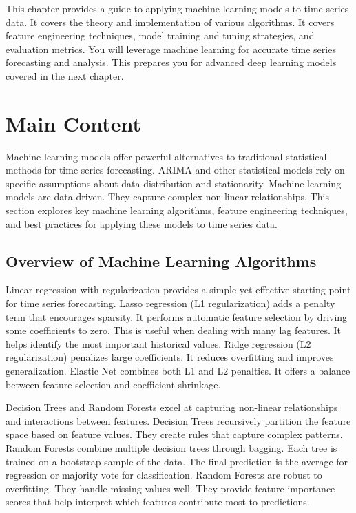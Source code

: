 This chapter provides a guide to applying machine learning models to time series data. It covers the theory and implementation of various algorithms. It covers feature engineering techniques, model training and tuning strategies, and evaluation metrics. You will leverage machine learning for accurate time series forecasting and analysis. This prepares you for advanced deep learning models covered in the next chapter.



\section{Main Content}

Machine learning models offer powerful alternatives to traditional statistical methods for time series forecasting. ARIMA and other statistical models rely on specific assumptions about data distribution and stationarity. Machine learning models are data-driven. They capture complex non-linear relationships. This section explores key machine learning algorithms, feature engineering techniques, and best practices for applying these models to time series data.

\subsection{Overview of Machine Learning Algorithms}

Linear regression with regularization provides a simple yet effective starting point for time series forecasting. Lasso regression (L1 regularization) adds a penalty term that encourages sparsity. It performs automatic feature selection by driving some coefficients to zero. This is useful when dealing with many lag features. It helps identify the most important historical values. Ridge regression (L2 regularization) penalizes large coefficients. It reduces overfitting and improves generalization. Elastic Net combines both L1 and L2 penalties. It offers a balance between feature selection and coefficient shrinkage.

Decision Trees and Random Forests excel at capturing non-linear relationships and interactions between features. Decision Trees recursively partition the feature space based on feature values. They create rules that capture complex patterns. Random Forests combine multiple decision trees through bagging. Each tree is trained on a bootstrap sample of the data. The final prediction is the average for regression or majority vote for classification. Random Forests are robust to overfitting. They handle missing values well. They provide feature importance scores that help interpret which features contribute most to predictions.

